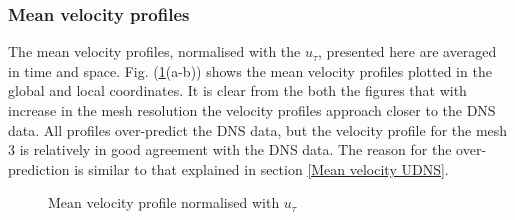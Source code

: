\subsubsection{Mean velocity profiles}
The mean velocity profiles, normalised with the $u_\tau$, presented here are averaged in time and space. Fig. (\ref{Mean profiles WALE}(a-b)) shows the mean velocity profiles plotted in the global and local coordinates. It is clear from the both the figures that with increase in the mesh resolution the velocity profiles approach closer to the DNS data. All profiles over-predict the DNS data, but the velocity profile for the mesh 3 is relatively in good agreement with the DNS data. The reason for the over-prediction is similar to that explained in section \ref{Mean velocity UDNS}.
\begin{figure}[h!]
\begin{minipage}[b]{0.5\textwidth}
\end{minipage}
%
\begin{minipage}[b]{0.5\textwidth}
\end{minipage}
\caption{Mean velocity profile normalised with $u_\tau$}
\label{Mean profiles WALE}
\end{figure}
